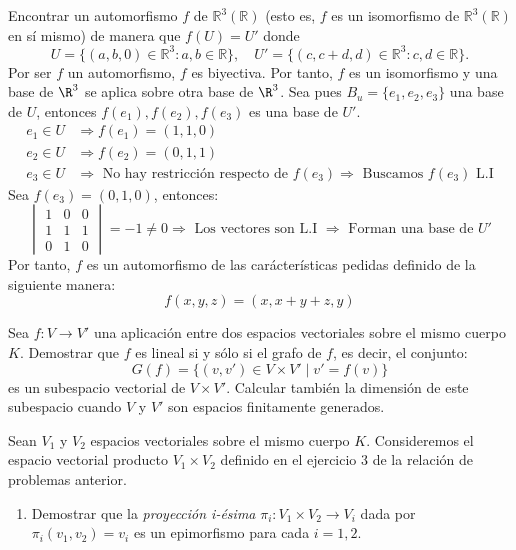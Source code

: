 \begin{ejercicio} Encontrar un automorfismo \( f \) de \( \mathbb{R}^3(\mathbb{R}) \) (esto es, \( f \) es un isomorfismo de \( \mathbb{R}^3(\mathbb{R}) \) en sí mismo) de manera que \( f(U) = U' \) donde
	\[ U = \{(a,b,0) \in \mathbb{R}^3 : a,b \in \mathbb{R}\}, \quad U' = \{(c,c + d,d) \in \mathbb{R}^3 : c,d \in \mathbb{R}\}. \]
	Por ser $f$ un automorfismo, $f$ es biyectiva. Por tanto, $f$ es un isomorfismo y una base de $\R^3$ se aplica sobre otra base de $\R^3$.
	Sea pues $B_u = \{e_1,e_2,e_3\}$ una base de $U$, entonces $f(e_1),f(e_2),f(e_3)$ es una base de $U'$.
	\begin{align*}
		e_1 \in U & \Rightarrow f(e_1) = (1,1,0)                                                                                \\
		e_2 \in U & \Rightarrow f(e_2) = (0,1,1)                                                                                \\
		e_3 \in U & \Rightarrow \text{ No hay restricción respecto de } f(e_3) \Rightarrow \text{ Buscamos } f(e_3) \text{ L.I}
	\end{align*}
	Sea $f(e_3) = (0,1,0)$, entonces:
	\begin{equation*}
		\begin{vmatrix}
			1 & 0 & 0 \\
			1 & 1 & 1 \\
			0 & 1 & 0
		\end{vmatrix} = -1 \neq 0 \Rightarrow \text{ Los vectores son L.I } \Rightarrow \text{ Forman una base de } U'
	\end{equation*}
	Por tanto, $f$ es un automorfismo de las carácterísticas pedidas definido de la siguiente manera:
	\begin{equation*}
		f(x,y,z) = (x,x+y+z,y)
	\end{equation*}
\end{ejercicio}
\begin{ejercicio}
	Sea \( f : V \rightarrow V' \) una aplicación entre dos espacios vectoriales sobre el mismo cuerpo \( K \). Demostrar que \( f \) es lineal si y sólo si el grafo de \( f \), es decir, el conjunto:
	\[ G(f) = \{(v,v') \in V \times V' \mid v' = f(v)\} \]
	es un subespacio vectorial de \( V \times V' \). Calcular también la dimensión de este subespacio cuando \( V \) y \( V' \) son espacios finitamente generados.
\end{ejercicio}

\begin{ejercicio}
	Sean \( V_1 \) y \( V_2 \) espacios vectoriales sobre el mismo cuerpo \( K \). Consideremos el espacio vectorial producto \( V_1 \times V_2 \) definido en el ejercicio 3 de la relación de problemas anterior.
	\begin{enumerate}
		\item Demostrar que la \textit{proyección i-ésima} \( \pi_i: V_1 \times V_2 \rightarrow V_i \) dada por \( \pi_i(v_1,v_2) = v_i \) es un epimorfismo para cada \( i = 1, 2 \).
	\end{enumerate}
\end{ejercicio}


